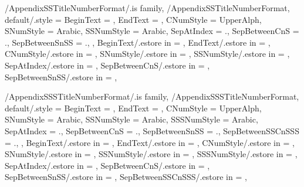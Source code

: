 
\pgfkeys
{
  /AppendixSSTitleNumberFormat/.is family, /AppendixSSTitleNumberFormat,
  default/.style =
  {
    BeginText = \empty,
    EndText = \empty,
    CNumStyle = UpperAlph,
    SNumStyle = Arabic,
    SSNumStyle = Arabic,
    SepAtIndex = {.}, %
    SepBetweenCnS = {.}, %
    SepBetweenSnSS = {.}, %
  },
  BeginText/.estore in = \GetAppendixSSTitleNumberFormatBeginText,
  EndText/.estore in = \GetAppendixSSTitleNumberFormatEndText,
  CNumStyle/.estore in = \GetAppendixSSTitleNumberFormatCNumStyle,
  SNumStyle/.estore in = \GetAppendixSSTitleNumberFormatSNumStyle,
  SSNumStyle/.estore in = \GetAppendixSSTitleNumberFormatSSNumStyle,
  SepAtIndex/.estore in = \GetAppendixSSTitleNumberFormatSepAtIndex,
  SepBetweenCnS/.estore in = \GetAppendixSSTitleNumberFormatSepBetweenCnS,
  SepBetweenSnSS/.estore in = \GetAppendixSSTitleNumberFormatSepBetweenSnSS,
} %

\newcommand\GetAppendixSubSectionTitleNumberFormatString{}
\newcommand\SetupAppendixSubSectionTitleNumberFormatString
{%
  \SetupTitleNumberFormatString{AppendixSubSection}%
  {%
    BeginText=\GetAppendixSSTitleNumberFormatBeginText,%
    EndText=\GetAppendixSSTitleNumberFormatEndText,%
    CNumStyle=\GetAppendixSSTitleNumberFormatCNumStyle,%
    SNumStyle=\GetAppendixSSTitleNumberFormatSNumStyle,%
    SSNumStyle=\GetAppendixSSTitleNumberFormatSSNumStyle,%
    SepAtIndex=\GetAppendixSSTitleNumberFormatSepAtIndex,%
    SepBetweenCnS=\GetAppendixSSTitleNumberFormatSepBetweenCnS,%
    SepBetweenSnSS=\GetAppendixSSTitleNumberFormatSepBetweenSnSS,%
    CCounterName=appendixchapter,%
    SCounterName=appendixsection,%
    SSCounterName=appendixsubsection,%
  }{\GetAppendixSubSectionTitleNumberFormatString}%
} %


\pgfkeys
{
  /AppendixSSSTitleNumberFormat/.is family, /AppendixSSSTitleNumberFormat,
  default/.style =
  {
    BeginText = \empty,
    EndText = \empty,
    CNumStyle = UpperAlph,
    SNumStyle = Arabic,
    SSNumStyle = Arabic,
    SSSNumStyle = Arabic,
    SepAtIndex = {.}, %
    SepBetweenCnS = {.}, %
    SepBetweenSnSS = {.}, %
    SepBetweenSSCnSSS = {.}, %
  },
  BeginText/.estore in = \GetAppendixSSSTitleNumberFormatBeginText,
  EndText/.estore in = \GetAppendixSSSTitleNumberFormatEndText,
  CNumStyle/.estore in = \GetAppendixSSSTitleNumberFormatCNumStyle,
  SNumStyle/.estore in = \GetAppendixSSSTitleNumberFormatSNumStyle,
  SSNumStyle/.estore in = \GetAppendixSSSTitleNumberFormatSSNumStyle,
  SSSNumStyle/.estore in = \GetAppendixSSSTitleNumberFormatSSSNumStyle,
  SepAtIndex/.estore in = \GetAppendixSSSTitleNumberFormatSepAtIndex,
  SepBetweenCnS/.estore in = \GetAppendixSSSTitleNumberFormatSepBetweenCnS,
  SepBetweenSnSS/.estore in = \GetAppendixSSSTitleNumberFormatSepBetweenSnSS,
  SepBetweenSSCnSSS/.estore in = \GetAppendixSSSTitleNumberFormatSepBetweenSSCnSSS,
} %

